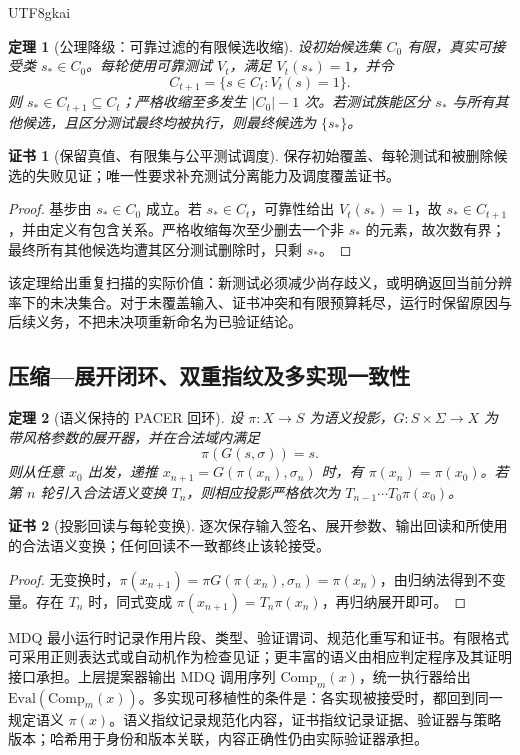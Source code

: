 \documentclass[11pt,a4paper]{article}
\theoremstyle{plain}
\newtheorem{theorem}{定理}[section]
\theoremstyle{definition}
\newtheorem*{certificate}{证书}
\theoremstyle{remark}
\begin{document}
\begin{CJK*}{UTF8}{gkai}
\begin{theorem}[公理降级：可靠过滤的有限候选收缩]
\label{fa:thm-filter}
设初始候选集 $C_0$ 有限，真实可接受类 $s_*\in C_0$。每轮使用可靠测试 $V_t$，满足 $V_t(s_*)=1$，并令
\[
 C_{t+1}=\{s\in C_t:V_t(s)=1\}.
\]
则 $s_*\in C_{t+1}\subseteq C_t$；严格收缩至多发生 $|C_0|-1$ 次。若测试族能区分 $s_*$ 与所有其他候选，且区分测试最终均被执行，则最终候选为 $\{s_*\}$。
\end{theorem}
\begin{certificate}[保留真值、有限集与公平测试调度]
保存初始覆盖、每轮测试和被删除候选的失败见证；唯一性要求补充测试分离能力及调度覆盖证书。
\end{certificate}
\begin{proof}
基步由 $s_*\in C_0$ 成立。若 $s_*\in C_t$，可靠性给出 $V_t(s_*)=1$，故 $s_*\in C_{t+1}$，并由定义有包含关系。严格收缩每次至少删去一个非 $s_*$ 的元素，故次数有界；最终所有其他候选均遭其区分测试删除时，只剩 $s_*$。
\end{proof}

该定理给出重复扫描的实际价值：新测试必须减少尚存歧义，或明确返回当前分辨率下的未决集合。对于未覆盖输入、证书冲突和有限预算耗尽，运行时保留原因与后续义务，不把未决项重新命名为已验证结论。

\subsection{压缩—展开闭环、双重指纹及多实现一致性}

\begin{theorem}[语义保持的 PACER 回环]
\label{fa:thm-pacer}
设 $\pi:X\to S$ 为语义投影，$G:S\times\Sigma\to X$ 为带风格参数的展开器，并在合法域内满足
\[
 \pi(G(s,\sigma))=s.
\]
则从任意 $x_0$ 出发，递推 $x_{n+1}=G(\pi(x_n),\sigma_n)$ 时，有 $\pi(x_n)=\pi(x_0)$。若第 $n$ 轮引入合法语义变换 $T_n$，则相应投影严格依次为 $T_{n-1}\cdots T_0\pi(x_0)$。
\end{theorem}
\begin{certificate}[投影回读与每轮变换]
逐次保存输入签名、展开参数、输出回读和所使用的合法语义变换；任何回读不一致都终止该轮接受。
\end{certificate}
\begin{proof}
无变换时，$\pi(x_{n+1})=\pi G(\pi(x_n),\sigma_n)=\pi(x_n)$，由归纳法得到不变量。存在 $T_n$ 时，同式变成 $\pi(x_{n+1})=T_n\pi(x_n)$，再归纳展开即可。
\end{proof}

MDQ 最小运行时记录作用片段、类型、验证谓词、规范化重写和证书。有限格式可采用正则表达式或自动机作为检查见证；更丰富的语义由相应判定程序及其证明接口承担。上层提案器输出 MDQ 调用序列 $\mathrm{Comp}_m(x)$，统一执行器给出 $\mathrm{Eval}(\mathrm{Comp}_m(x))$。多实现可移植性的条件是：各实现被接受时，都回到同一规定语义 $\pi(x)$。语义指纹记录规范化内容，证书指纹记录证据、验证器与策略版本；哈希用于身份和版本关联，内容正确性仍由实际验证器承担。\cite{S12}


\end{CJK*}
\end{document}
